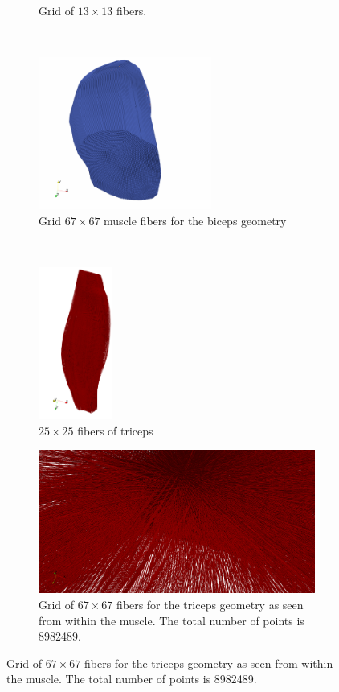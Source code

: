 \begin{figure}
\begin{subfigure}[t]{0.30\textwidth}
    \caption{Grid of $13 \times 13$ fibers.}%
    \label{fig:muscle_mesh_2}%
  \end{subfigure}
  \\
  \begin{subfigure}[t]{0.25\textwidth}%
    \centering%
    \includegraphics[height=5cm]{images/parallel_fiber_estimation/muscle_mesh_3.png}
    \caption{Grid $67 \times 67$ muscle fibers for the biceps geometry}%
    \label{fig:muscle_mesh_3}%
  \end{subfigure} 
  \,
  \begin{subfigure}[t]{0.15\textwidth}%
    \centering%
    \includegraphics[height=5cm]{images/parallel_fiber_estimation/triceps_25x25.png}
    \caption{$25 \times 25$ fibers of triceps}%
    \label{fig:muscle_mesh_5}%
  \end{subfigure} 
  \hfill
  \begin{subfigure}[t]{0.55\textwidth}%
    \centering%
    \includegraphics[width=\textwidth]{images/parallel_fiber_estimation/triceps_inside_67x67c.png}
    \caption{Grid of $67 \times 67$ fibers for the triceps geometry as seen from within the muscle. The total number of points is \num{8982489}.}%
    \label{fig:muscle_mesh_4}%
  \end{subfigure}  
   

\end{figure}
